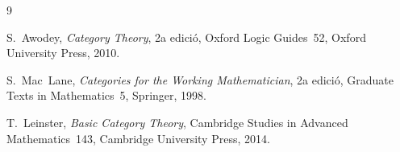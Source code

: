 \begin{thebibliography}{9}

S.~Awodey,
\emph{Category Theory},
2a edició, Oxford Logic Guides~52, Oxford University Press, 2010.

S.~Mac~Lane,
\emph{Categories for the Working Mathematician},
2a edició, Graduate Texts in Mathematics~5, Springer, 1998.

T.~Leinster,
\emph{Basic Category Theory},
Cambridge Studies in Advanced Mathematics~143, Cambridge University Press, 2014.

\end{thebibliography}